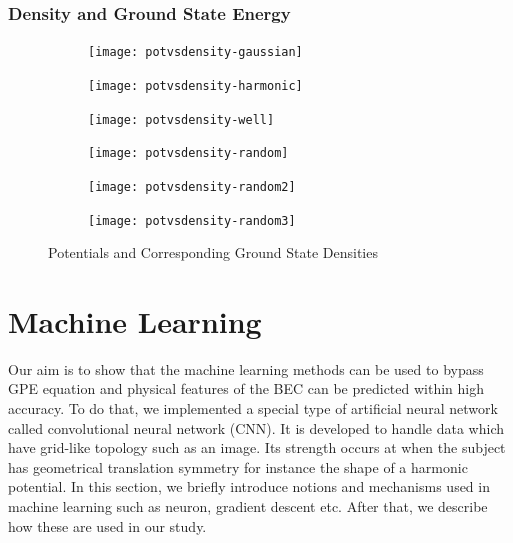 \documentclass[a4paper,times,hidelinks,12pt]{article}
\begin{document}
\subsubsection{Density and Ground State Energy}

\graphicspath{{"../figs/potentials/"}}
\begin{figure}[H]
    \centering
    \begin{subfigure}[t]{0.45\textwidth}
        \texttt{[image: potvsdensity-gaussian]}
    \end{subfigure}
    \begin{subfigure}[t]{0.45\textwidth}
        \texttt{[image: potvsdensity-harmonic]}
    \end{subfigure}
    \begin{subfigure}[t]{0.45\textwidth}
        \texttt{[image: potvsdensity-well]}
    \end{subfigure}
    \begin{subfigure}[t]{0.45\textwidth}
        \texttt{[image: potvsdensity-random]}
    \end{subfigure}
    \begin{subfigure}[t]{0.45\textwidth}
        \texttt{[image: potvsdensity-random2]}
    \end{subfigure}
    \begin{subfigure}[t]{0.45\textwidth}
        \texttt{[image: potvsdensity-random3]}
    \end{subfigure}
\caption{Potentials and Corresponding Ground State Densities}
\label{fig:random3_before_after}
\end{figure}



\section{Machine Learning}
\label{sec:machine_learning}

Our aim is to show that the machine learning methods can be used to bypass GPE equation and physical features of the BEC can be predicted within high accuracy. To do that, we implemented a special type of artificial neural network called convolutional neural network (CNN). It is developed to handle data which have grid-like topology \cite{goodfellow2016deep} such as an image. Its strength occurs at when the subject has geometrical translation symmetry for instance the shape of a harmonic potential. In this section, we briefly introduce notions and mechanisms used in machine learning such as neuron, gradient descent etc. After that, we describe how these are used in our study.  
\end{document}
